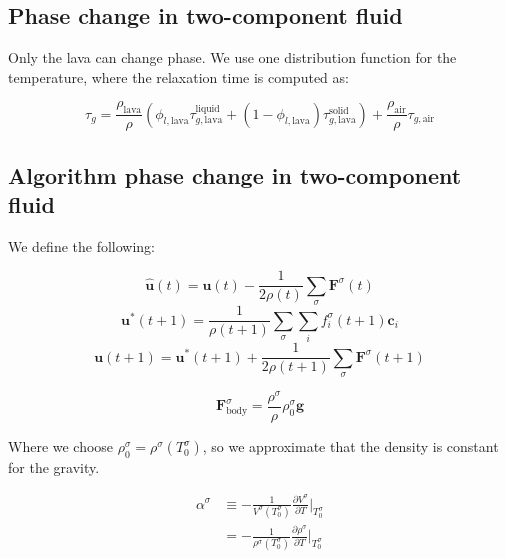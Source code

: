 \subsection{Phase change in two-component fluid}
Only the lava can change phase. We use one distribution function for the temperature, where the relaxation time is computed as:

\begin{equation}
    \tau_g = \frac{\rho_{\text{lava}}}{\rho} \left(\phi_{l,\text{lava}}\tau_{g,\text{lava}}^{\text{liquid}} + \left(1-\phi_{l,\text{lava}}\right)\tau_{g,\text{lava}}^{\text{solid}}\right) + \frac{\rho_{\text{air}}}{\rho}\tau_{g,\text{air}}
\end{equation}

\subsection{Algorithm phase change in two-component fluid}

We define the following:

\begin{equation}
    \hat{\bm{u}}(t) = \bm{u}(t) - \frac{1}{2 \rho(t)} \sum_\sigma \bm{F}^\sigma(t)
\end{equation}
\begin{equation}
    \bm{u}^*(t+1) = \frac{1}{\rho(t+1)}\sum_\sigma \sum_i f_i^\sigma(t+1) \bm{c}_i
\end{equation}
\begin{equation}
    \bm{u}(t+1) = \bm{u}^*(t+1) + \frac{1}{2 \rho(t+1)} \sum_\sigma \bm{F}^\sigma(t+1)
\end{equation}

\begin{equation}
    \bm{F}_{\text{body}}^\sigma = \frac{\rho^\sigma}{\rho}\rho^\sigma_0 \bm{g}
\end{equation}

Where we choose $\rho_0^\sigma = \rho^\sigma(T_0^\sigma)$, so we approximate that the density is constant for the gravity. 

\begin{equation}
\begin{split}
    \alpha^\sigma &\equiv -\frac{1}{V^\sigma(T_0^\sigma)} \frac{\partial V^\sigma}{\partial T}\Bigr|_{T_0^\sigma}\\
    &= -\frac{1}{\rho^\sigma(T_0^\sigma)} \frac{\partial \rho^\sigma}{\partial T}\Bigr|_{T_0^\sigma}\\
\end{split}
\end{equation}

